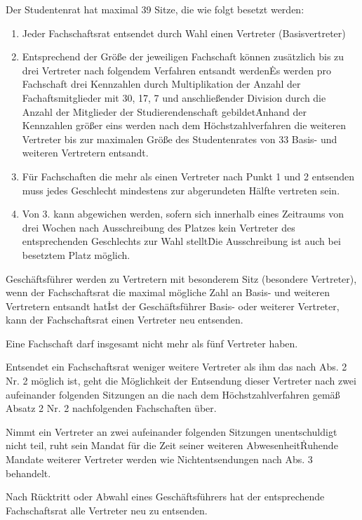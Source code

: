 \begin{multicols}{2}
\Abs \Satz Der Studentenrat hat maximal 39 Sitze, die wie folgt besetzt werden:
\begin{enumerate}
\item Jeder Fachschaftsrat entsendet durch Wahl einen Vertreter (Basisvertreter)
\setcounter{sentence}{0}
\item \Satz Entsprechend der Größe der jeweiligen Fachschaft können zusätzlich bis zu drei Vertreter nach folgendem Verfahren entsandt werden\. Es werden pro Fachschaft drei Kennzahlen durch Multiplikation der Anzahl der Fachaftsmitglieder mit 30, 17, 7 und anschließender Division durch die Anzahl der Mitglieder der Studierendenschaft gebildet\. Anhand der Kennzahlen größer eins werden nach dem Höchstzahlverfahren die weiteren Vertreter bis zur maximalen Größe des Studentenrates von 33 Basis- und weiteren Vertretern entsandt.
\item Für Fachschaften die mehr als einen Vertreter nach Punkt 1 und 2 entsenden muss jedes Geschlecht mindestens zur abgerundeten Hälfte vertreten sein.
\setcounter{sentence}{0}
\item \Satz Von 3. kann abgewichen werden, sofern sich innerhalb eines Zeitraums von drei Wochen
nach Ausschreibung des Platzes kein Vertreter des entsprechenden Geschlechts zur Wahl
stellt\. Die Ausschreibung ist auch bei besetztem Platz möglich.
\end{enumerate}

\Abs \Satz Geschäftsführer werden zu Vertretern mit besonderem Sitz (besondere Vertreter), wenn der Fachschaftsrat die maximal mögliche Zahl an Basis- und weiteren Vertretern entsandt hat\. Ist der Geschäftsführer Basis- oder weiterer Vertreter, kann der Fachschaftsrat einen Vertreter neu entsenden.

\Abs \Satz Eine Fachschaft darf insgesamt nicht mehr als fünf Vertreter haben.

\Abs \Satz Entsendet ein Fachschaftsrat weniger weitere Vertreter als ihm das nach Abs. 2 Nr. 2 möglich ist, geht die Möglichkeit der Entsendung dieser Vertreter nach zwei aufeinander folgenden Sitzungen an die nach dem Höchstzahlverfahren gemäß Absatz 2 Nr. 2 nachfolgenden Fachschaften über.

\Abs \Satz Nimmt ein Vertreter an zwei aufeinander folgenden Sitzungen unentschuldigt nicht teil, ruht sein Mandat für die Zeit seiner weiteren Abwesenheit\. Ruhende Mandate weiterer Vertreter werden wie Nichtentsendungen nach Abs. 3 behandelt.

\Abs \Satz Nach Rücktritt oder Abwahl eines Geschäftsführers hat der entsprechende Fachschaftsrat alle Vertreter neu zu entsenden.


\end{multicols}

